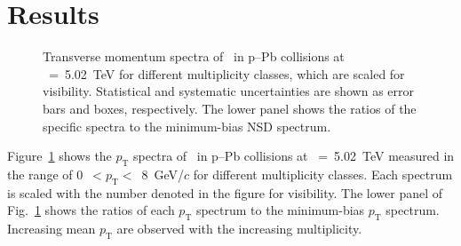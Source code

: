
\section {Results}
\label{sec:results}

\begin{figure}[!hbt]
	\centering
	\caption{ Transverse momentum spectra of \fzero~in p--Pb collisions at \snn~=~5.02~TeV for different multiplicity classes, which are scaled for visibility. Statistical and systematic uncertainties are shown as error bars and boxes, respectively. The lower panel shows the ratios of the specific spectra to the minimum-bias NSD spectrum. }
	\label{fig:pt}
\end{figure}

Figure~\ref{fig:pt} shows the $p_{\mathrm{T}}$ spectra of \fzero~in p--Pb collisions at \snn~=~5.02~TeV measured in the range of 0~$<p_{\mathrm{T}}<$~8~GeV/$c$ for different multiplicity classes. Each spectrum is scaled with the number denoted in the figure for visibility. The lower panel of Fig.~\ref{fig:pt} shows the ratios of each $p_{\mathrm{T}}$ spectrum to the minimum-bias $p_{\mathrm{T}}$ spectrum. Increasing mean $p_{\mathrm{T}}$ are observed with the increasing multiplicity.

